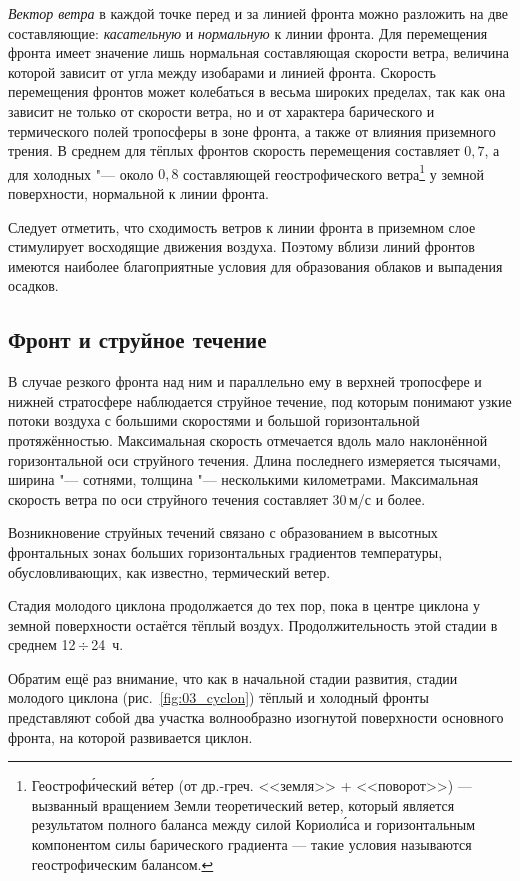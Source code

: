 \documentclass[a4paper, 12pt, twoside, draft, book, russian, fittopage, cyremdash, openright]{ncc}
\newcommand{\mps}{\,м/с\xspace}
\newcommand{\otdo}{\,\ensuremath{\div}\,}
\begin{document}
\textit{Вектор ветра} в каждой точке перед и за линией фронта можно
разложить на две составляющие: \textit{касательную} и
\textit{нормальную} к линии фронта. Для перемещения фронта имеет
значение лишь нормальная составляющая скорости ветра, величина которой
зависит от угла между изобарами и линией фронта. Скорость перемещения
фронтов может колебаться в весьма широких пределах, так как она
зависит не только от скорости ветра, но и от характера барического и
термического полей тропосферы в зоне фронта, а также от влияния
приземного трения. В среднем для тёплых фронтов скорость перемещения
составляет $0,7$, а для холодных "--- около $0,8$ составляющей
геострофического ветра\footnote{Геостроф\'{и}ческий в\'{е}тер (от
  др.-греч. <<земля>> + <<поворот>>) — вызванный вращением Земли
  теоретический ветер, который является результатом полного баланса
  между силой Кориол\'{и}са и горизонтальным компонентом силы
  барического градиента — такие условия называются геострофическим
  балансом.}  у земной поверхности, нормальной к линии фронта.

Следует отметить, что сходимость ветров к линии фронта в приземном
слое стимулирует восходящие движения воздуха. Поэтому вблизи линий
фронтов имеются наиболее благоприятные условия для образования облаков
и выпадения осадков.

\subsection{Фронт и струйное течение}
\label{sec:front_and_stream}

В случае резкого фронта над ним и параллельно ему в верхней тропосфере
и нижней стратосфере наблюдается струйное течение, под которым
понимают узкие потоки воздуха с большими скоростями и большой
горизонтальной протяжённостью. Максимальная скорость отмечается вдоль
мало наклонённой горизонтальной оси струйного течения. Длина
последнего измеряется тысячами, ширина "--- сотнями, толщина "---
несколькими километрами. Максимальная скорость ветра по оси струйного
течения составляет 30\mps и более.

Возникновение струйных течений связано с образованием в высотных
фронтальных зонах больших горизонтальных градиентов температуры,
обусловливающих, как известно, термический ветер.

Стадия молодого циклона продолжается до тех пор, пока в центре циклона
у земной поверхности остаётся тёплый воздух. Продолжительность этой
стадии в среднем 12\otdo24~ч.

Обратим ещё раз внимание, что как в начальной стадии развития, стадии
молодого циклона (рис.~\ref{fig:03_cyclon}) тёплый и холодный фронты представляют собой два
участка волнообразно изогнутой поверхности основного фронта, на
которой развивается циклон.
\end{document}
